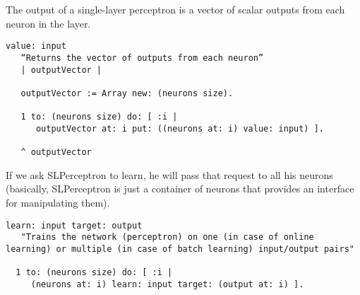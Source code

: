 The output of a single-layer perceptron is a vector of scalar outputs from each neuron in the layer.

\begin{lstlisting}
value: input
   “Returns the vector of outputs from each neuron”
   | outputVector |
 
   outputVector := Array new: (neurons size).
 
   1 to: (neurons size) do: [ :i |
      outputVector at: i put: ((neurons at: i) value: input) ].
 
   ^ outputVector
\end{lstlisting}

If we ask SLPerceptron to learn, he will pass that request to all his neurons (basically, SLPerceptron is just a container of neurons that provides an interface for manipulating them).

\begin{lstlisting}
learn: input target: output
   "Trains the network (perceptron) on one (in case of online learning) or multiple (in case of batch learning) input/output pairs"

  1 to: (neurons size) do: [ :i |
     (neurons at: i) learn: input target: (output at: i) ].
\end{lstlisting}

